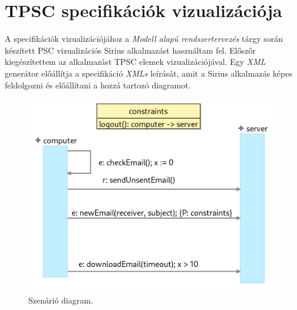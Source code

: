 \chapter{TPSC specifikációk vizualizációja}

A specifikációk vizualizációjához a \textit{Modell alapú rendszertervezés} tárgy során készített PSC vizualizációs Sirius alkalmazást használtam fel.
Előszőr kiegészítettem az alkalmazást TPSC elemek vizualizációjával.
Egy \textit{XML} generátor előállítja a specifikáció \textit{XMLs} leírását, amit a Sirius alkalmazás képes feldolgozni és előállítani a hozzá tartozó diagramot.

\begin{figure}[!ht]
    \centering
    \includegraphics[width=150mm, keepaspectratio]{figures/diagramExample.png}
    \caption{Szenárió diagram.}
\end{figure}

